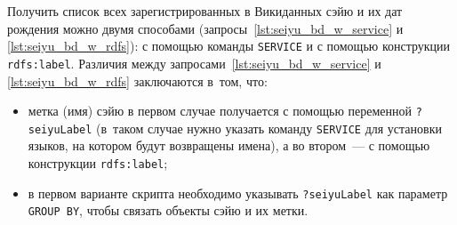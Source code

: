 \newpage
Получить список всех зарегистрированных в Викиданных сэйю и их дат рождения 
можно двумя способами (запросы~\ref{lst:seiyu_bd_w_service} и \ref{lst:seiyu_bd_w_rdfs}): 
с помощью команды \lstinline|SERVICE| 
и с помощью конструкции \mbox{\lstinline|rdfs:label|}. 
Различия между запросами~\ref{lst:seiyu_bd_w_service} и \ref{lst:seiyu_bd_w_rdfs} заключаются в~том, что:
%
\begin{itemize}%
    \item метка (имя) сэйю в первом случае получается с помощью переменной \lstinline|?seiyuLabel| 
        (в~таком случае нужно указать команду \lstinline|SERVICE| для установки языков, на котором будут возвращены имена), 
        а во втором~--- с помощью конструкции \lstinline|rdfs:label|;
    \item в первом варианте скрипта необходимо указывать \lstinline|?seiyuLabel| 
        как параметр \lstinline|GROUP BY|, чтобы связать объекты сэйю и их метки.
\end{itemize}


